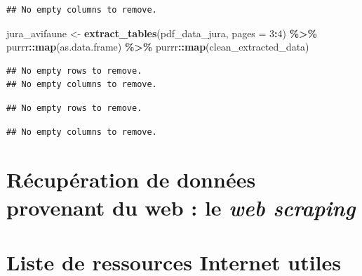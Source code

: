 \documentclass[
  french,
]{book}
\newenvironment{Shaded}{\begin{snugshade}}{\end{snugshade}}
\newcommand{\DataTypeTok}[1]{\textcolor[rgb]{0.13,0.29,0.53}{#1}}
\newcommand{\DecValTok}[1]{\textcolor[rgb]{0.00,0.00,0.81}{#1}}
\newcommand{\KeywordTok}[1]{\textcolor[rgb]{0.13,0.29,0.53}{\textbf{#1}}}
\newcommand{\NormalTok}[1]{#1}
\newcommand{\OperatorTok}[1]{\textcolor[rgb]{0.81,0.36,0.00}{\textbf{#1}}}
\newcommand{\StringTok}[1]{\textcolor[rgb]{0.31,0.60,0.02}{#1}}
\begin{document}
\begin{verbatim}
## No empty columns to remove.
\end{verbatim}

\begin{Shaded}
\begin{Highlighting}[]
\NormalTok{jura\_avifaune \textless{}{-}}\StringTok{ }\KeywordTok{extract\_tables}\NormalTok{(pdf\_data\_jura, }\DataTypeTok{pages =} \DecValTok{3}\OperatorTok{:}\DecValTok{4}\NormalTok{) }\OperatorTok{\%\textgreater{}\%}
\StringTok{  }\NormalTok{purrr}\OperatorTok{::}\KeywordTok{map}\NormalTok{(as.data.frame) }\OperatorTok{\%\textgreater{}\%}
\StringTok{  }\NormalTok{purrr}\OperatorTok{::}\KeywordTok{map}\NormalTok{(clean\_extracted\_data)}
\end{Highlighting}
\end{Shaded}

\begin{verbatim}
## No empty rows to remove.
## No empty columns to remove.
\end{verbatim}

\begin{verbatim}
## No empty rows to remove.
\end{verbatim}

\begin{verbatim}
## No empty columns to remove.
\end{verbatim}

\hypertarget{ruxe9cupuxe9ration-de-donnuxe9es-provenant-du-web-le-web-scraping}{%
\section{\texorpdfstring{Récupération de données provenant du web : le \emph{web scraping}}{Récupération de données provenant du web : le web scraping}}\label{ruxe9cupuxe9ration-de-donnuxe9es-provenant-du-web-le-web-scraping}}

\hypertarget{ref-data-analysis}{%
\section*{Liste de ressources Internet utiles}\label{ref-data-analysis}}
\end{document}
